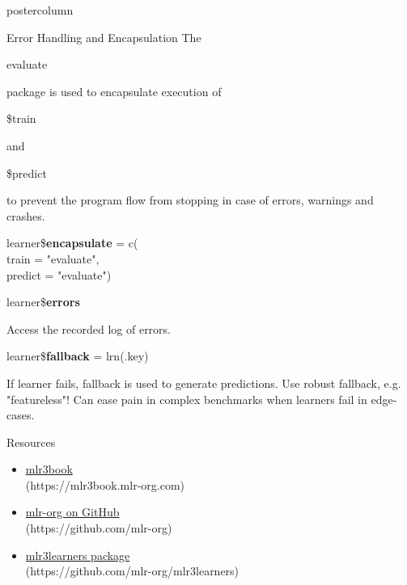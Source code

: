 \documentclass{beamer}
\newcommand{\codeinline}[1]{\begin{codeboxinline}#1\end{codeboxinline}}
\begin{document}
\begin{withoutheader}
\begin{frame}[fragile]{}
\begin{columns}
\begin{column}{.245\textwidth}
\begin{beamercolorbox}[center]{postercolumn}
\begin{minipage}{.98\textwidth}
{						\begin{myblock}{Error Handling and Encapsulation}
							The \codeinline{evaluate} package is used to encapsulate execution of \codeinline{\$train} and \codeinline{\$predict} to prevent the program flow from stopping in case of errors, warnings and crashes.
							\\
							\begin{codeboxmultiline}[width=16cm]
								learner\$\textbf{encapsulate} = c(\\
								\hspace*{1ex} train = "evaluate", \\
								\hspace*{1ex} predict = "evaluate")
							\end{codeboxmultiline}
							\begin{codebox}
								learner\$\textbf{errors}
							\end{codebox}
							Access the recorded log of errors.
							\vspace{1em}
							\\
							\begin{codebox}
								learner\$\textbf{fallback} = lrn(.key)
							\end{codebox}
							If learner fails, fallback is used to generate predictions. 
                            Use robust fallback, e.g. "featureless"! Can ease pain in complex benchmarks when learners fail in edge-cases.
						\end{myblock}
						\begin{myblock}{Resources}
							\begin{itemize}
								\item \href{https://mlr3book.mlr-org.com/index.html}{mlr3book}\\ (https://mlr3book.mlr-org.com)
								\item \href{https://github.com/mlr-org}{mlr-org on GitHub}\\ (https://github.com/mlr-org)
								\item \href{https://github.com/mlr-org/mlr3learners}{mlr3learners package}\\ (https://github.com/mlr-org/mlr3learners)

\end{itemize}
\end{myblock}}
\end{minipage}
\end{beamercolorbox}
\end{column}
\end{columns}
\end{frame}
\end{withoutheader}
\end{document}
